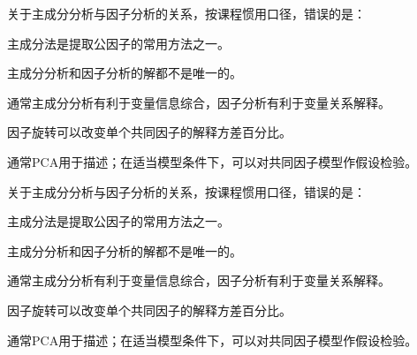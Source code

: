 \par\addvspace{6pt}\noindent\begin{minipage}{\linewidth}


关于主成分分析与因子分析的关系，按课程惯用口径，错误的是：


\begin{choices}

\item 主成分法是提取公因子的常用方法之一。

\item 主成分分析和因子分析的解都不是唯一的。

\item 通常主成分分析有利于变量信息综合，因子分析有利于变量关系解释。

\item 因子旋转可以改变单个共同因子的解释方差百分比。

\item 通常PCA用于描述；在适当模型条件下，可以对共同因子模型作假设检验。

\end{choices}

\end{minipage}\par\vspace{4pt}

\par\addvspace{6pt}\noindent\begin{minipage}{\linewidth}


关于主成分分析与因子分析的关系，按课程惯用口径，错误的是：


\begin{choices}

\item 主成分法是提取公因子的常用方法之一。

\item 主成分分析和因子分析的解都不是唯一的。

\item 通常主成分分析有利于变量信息综合，因子分析有利于变量关系解释。

\item 因子旋转可以改变单个共同因子的解释方差百分比。

\item 通常PCA用于描述；在适当模型条件下，可以对共同因子模型作假设检验。

\end{choices}

\end{minipage}\par\vspace{4pt}

